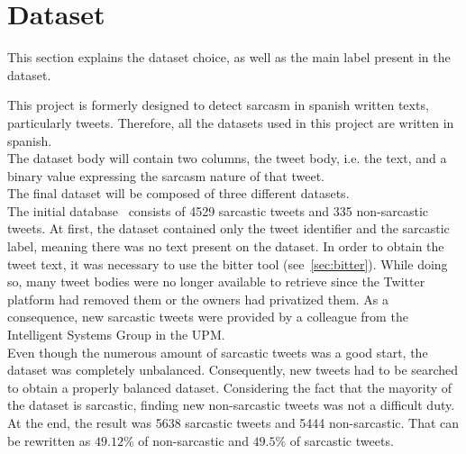 \section{Dataset}
\label{sec:use-cases}
This section explains the dataset choice, as well as the main label present in the dataset.\par
This project is formerly designed to detect sarcasm in spanish written texts, particularly tweets. Therefore, all the datasets used in this project are written in spanish.\\
The dataset body will contain two columns, the tweet body, i.e. the text, and a binary value expressing the sarcasm nature of that tweet.\\
The final dataset will be composed of three different datasets.\\ 
The initial database~\cite{mexic} consists of 4529 sarcastic tweets and 335 non-sarcastic tweets. At first, the dataset contained only the tweet identifier and the sarcastic label, meaning there was no text present on the dataset. In order to obtain the tweet text, it was necessary to use the bitter tool (see~\cref{sec:bitter}). While doing so, many tweet bodies were no longer available to retrieve since the Twitter platform had removed them or the owners had privatized them. As a consequence, new sarcastic tweets were provided by a colleague from the Intelligent Systems Group in the UPM.\\
Even though the numerous amount of sarcastic tweets was a good start, the dataset was completely unbalanced. Consequently, new tweets had to be searched to obtain a properly balanced dataset. Considering the fact that the mayority of the dataset is sarcastic, finding new non-sarcastic tweets was not a difficult duty.\\
At the end, the result was 5638 sarcastic tweets and 5444 non-sarcastic. That can be rewritten as $49.12\%$ of non-sarcastic and $49.5\%$ of sarcastic tweets.\par


